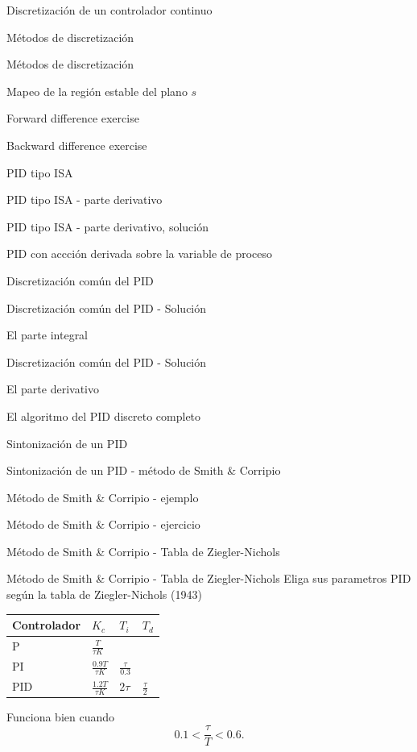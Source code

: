 \documentclass[presentation,aspectratio=1610]{beamer}
\begin{document}
\begin{frame}[label={sec:org86d23da}]{Discretización de un controlador continuo}
\begin{frame}[label={sec:org3ca2082}]{Métodos de discretización}
\begin{frame}[label={sec:orga78cff2}]{Métodos de discretización}
\begin{frame}[label={sec:org28bff53}]{Mapeo de la región estable del plano \(s\)}
\begin{frame}[label={sec:org9bb57fa}]{Forward difference exercise}
\begin{frame}[label={sec:orgaf8c1b0}]{Backward difference exercise}
\begin{frame}[label={sec:orgb2215e6}]{PID tipo ISA}
\begin{frame}[label={sec:orga06296a}]{PID tipo ISA - parte derivativo}
\begin{frame}[label={sec:org978e098}]{PID tipo ISA - parte derivativo, solución}
\begin{frame}[label={sec:orgf3b475b}]{PID con accción derivada sobre la variable de proceso}
\begin{frame}[label={sec:org5c3258e}]{Discretización común del PID}
\begin{frame}[label={sec:org95130b5}]{Discretización común del PID - Solución}
\begin{block}{El parte integral}
\begin{frame}[label={sec:org35f72c2}]{Discretización común del PID - Solución}
\begin{block}{El parte derivativo}
\begin{frame}[label={sec:org34749bc}]{El algoritmo del PID discreto completo}
\begin{frame}[label={sec:orgaefa60b}]{Sintonización de un PID}
\begin{frame}[label={sec:orge6db74e}]{Sintonización de un PID - método de Smith \& Corripio}
\begin{frame}[label={sec:org7d7b902}]{Método de Smith \& Corripio - ejemplo}
\begin{frame}[label={sec:org7c57aa3}]{Método de Smith \& Corripio - ejercicio}
\begin{frame}[label={sec:org5d33a76}]{Método de Smith \& Corripio - Tabla de Ziegler-Nichols}
\begin{frame}[label={sec:org5f70299}]{Método de Smith \& Corripio - Tabla de Ziegler-Nichols}
Eliga sus parametros PID según la tabla de Ziegler-Nichols (1943)
   \begin{center}
   \setlength{\tabcolsep}{20pt}
   \renewcommand{\arraystretch}{1.5}
   \begin{tabular}{llll}
   Controlador & \(K_c\) & \(T_i\) & \(T_d\)\\
  \hline\hline
  P & \(\frac{T}{\tau K}\) &  & \\
  PI & \(\frac{0.9T}{\tau K}\) & \(\frac{\tau}{0.3}\) & \\
  PID & \(\frac{1.2T}{\tau K}\) & \(2\tau\) & \(\frac{\tau}{2}\)\\
  \hline
\end{tabular}
\end{center}

Funciona bien cuando \[0.1 < \frac{\tau}{T} < 0.6.\]
\end{frame}



\end{frame}
\end{frame}
\end{frame}
\end{frame}
\end{frame}
\end{frame}
\end{block}
\end{frame}
\end{block}
\end{frame}
\end{frame}
\end{frame}
\end{frame}
\end{frame}
\end{frame}
\end{frame}
\end{frame}
\end{frame}
\end{frame}
\end{frame}
\end{frame}
\end{document}
